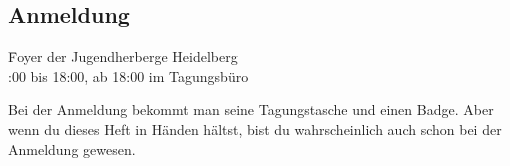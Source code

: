 \noindent %

\subsection{Anmeldung}
\begin{tabbing}
\faMapPin \quad \quad \quad \= Foyer der Jugendherberge Heidelberg\\ %
\faClockO {}:00 bis 18:00, ab 18:00 im Tagungsbüro %
\end{tabbing}

\noindent Bei der Anmeldung bekommt man seine Tagungstasche und einen Badge. Aber wenn du dieses Heft in Händen hältst, bist du wahrscheinlich auch schon bei der Anmeldung gewesen. %

